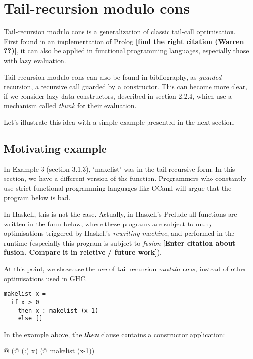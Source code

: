 \documentclass[diploma]{softlab-thesis}
\begin{document}
\section {Tail-recursion modulo cons}

Tail-recursion modulo cons is a generalization of classic tail-call optimisation. First found in an 
implementation of Prolog \textbf{[find the right citation (Warren ??)]}, it can also be applied in 
functional programming languages, especially those with lazy evaluation. 

Tail recursion modulo cons can also be found in bibliography, as \textit{guarded} recursion, 
a recursive call guarded by a constructor. This can become more clear, if we consider lazy data constructors, 
described in section 2.2.4, which use a mechanism called \textit{thunk} for their evaluation.

Let's illustrate this idea with a simple example presented in the next section.

\subsection {Motivating example}
In Example 3 (section 3.1.3), `makelist' was in the tail-recursive 
form. In this section, we have a different version of the function. 
Programmers who constantly use strict functional programming languages like OCaml 
will argue that the program below is bad. 

In Haskell, this is not the case. Actually, in Haskell's Prelude all functions are written 
in the form below, where these programs are subject to many optimisations triggered by Haskell's \textit{rewriting machine},
and performed in the runtime (especially this program is subject to \textit{fusion} \textbf{[Enter citation about 
fusion. Compare it in reletive / future work]}). 
\newline
\par At this point, we showcase the use of tail recursion \textit{modulo cons}, instead of other optimisations
used in GHC.

\begin{verbatim}
makelist x = 
  if x > 0 
    then x : makelist (x-1)
    else []
\end{verbatim}

In the example above, the \textbf{\textit{then}} clause contains a constructor 
application: 
\begin{center}
  @ (@ (:) x) (@ makelist (x-1))
\end{center}
\end{document}
